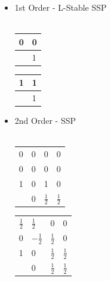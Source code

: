 \documentclass[10pt]{beamer}
\begin{document}
    \begin{frame}
      \begin{itemize}
        \item 1st Order - L-Stable SSP \hfill \\ \hfill \\
          \begin{tabular}{r|l}
            0 & 0 \\
            \midrule
              & 1
          \end{tabular}\hspace{0.5cm}
          \begin{tabular}{r|l}
            1 & 1 \\
            \midrule
              & 1
          \end{tabular}

        \vspace{0.5cm}

        \item 2nd Order - SSP \hfill \\ \hfill \\
          \begin{tabular}{r|lll}
            0 & 0 & 0 & 0 \\
            0 & 0 & 0 & 0 \\
            1 & 0 & 1 & 0 \\
            \midrule
              & 0 & $\frac{1}{2}$ & $\frac{1}{2}$ \\
          \end{tabular}\hspace{0.5cm}
          \begin{tabular}{r|lll}
            $\frac{1}{2}$ & $\frac{1}{2}$ & 0 & 0 \\
            0 & $-\frac{1}{2}$ & $\frac{1}{2}$ & 0 \\
            1 & 0 & $\frac{1}{2}$ & $\frac{1}{2}$ \\
            \midrule
              & 0 & $\frac{1}{2}$ & $\frac{1}{2}$ \\
          \end{tabular}
      \end{itemize}
    \end{frame}
\end{document}
